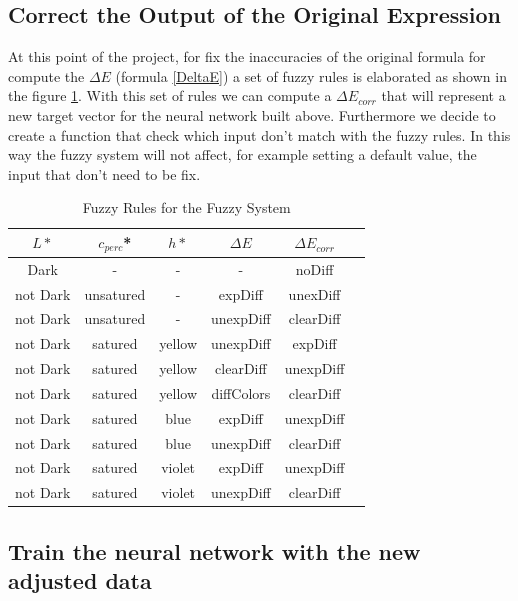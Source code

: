 \documentclass{article}
\begin{document}
\subsection{Correct the Output of the Original Expression} 

At this point of the project, for fix the inaccuracies of the original formula for compute the $\Delta E$ (formula \ref{DeltaE}) a set of fuzzy rules is elaborated as shown in the figure \ref{tab:fuzzyrules}.
With this set of rules we can compute a $\Delta E_{corr}$ that will represent a new target vector for the neural network built above.
Furthermore we decide to create a function that check which input don't match with the fuzzy rules. In this way the fuzzy system will not affect, for example setting a default value, the input that don't need to be fix.

\begin{table}[h!]
  \begin{center}
    \label{tab:fuzzyrules}
    \begin{tabular}{c|c|c|c|c|c} 
      $L*$&$c_{perc}$*&$h*$&$\Delta E$&$\Delta E_{corr}$\\
       \hline
     Dark &-&-&-&noDiff\\
     not Dark &unsatured&-&expDiff&unexDiff\\    
     not Dark &unsatured&-&unexpDiff&clearDiff\\   
     not Dark &satured&yellow&unexpDiff&expDiff\\   
     not Dark &satured&yellow&clearDiff&unexpDiff\\   
     not Dark &satured&yellow&diffColors&clearDiff\\   
     not Dark &satured&blue&expDiff&unexpDiff\\   
     not Dark &satured&blue&unexpDiff&clearDiff\\   
     not Dark &satured&violet&expDiff&unexpDiff\\   
     not Dark &satured&violet&unexpDiff&clearDiff\\   

     \end{tabular}
    \caption{Fuzzy Rules for the Fuzzy System}
  \end{center}
\end{table}


\subsection{Train the neural network with the new adjusted data} 
\end{document}
